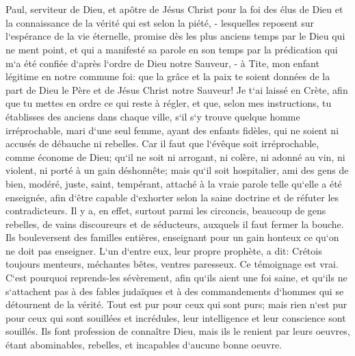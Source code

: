 

\chapter{}

\verse Paul, serviteur de Dieu, et apôtre de Jésus Christ pour la foi des élus de Dieu et la connaissance de la vérité qui est selon la piété, - 
\verse lesquelles reposent sur l`espérance de la vie éternelle, promise dès les plus anciens temps par le Dieu qui ne ment point, 
\verse et qui a manifesté sa parole en son temps par la prédication qui m`a été confiée d`après l`ordre de Dieu notre Sauveur, - 
\verse à Tite, mon enfant légitime en notre commune foi: que la grâce et la paix te soient données de la part de Dieu le Père et de Jésus Christ notre Sauveur! 
\verse Je t`ai laissé en Crète, afin que tu mettes en ordre ce qui reste à régler, et que, selon mes instructions, tu établisses des anciens dans chaque ville, 
\verse s`il s`y trouve quelque homme irréprochable, mari d`une seul femme, ayant des enfants fidèles, qui ne soient ni accusés de débauche ni rebelles. 
\verse Car il faut que l`évêque soit irréprochable, comme économe de Dieu; qu`il ne soit ni arrogant, ni colère, ni adonné au vin, ni violent, ni porté à un gain déshonnête; 
\verse mais qu`il soit hospitalier, ami des gens de bien, modéré, juste, saint, tempérant, 
\verse attaché à la vraie parole telle qu`elle a été enseignée, afin d`être capable d`exhorter selon la saine doctrine et de réfuter les contradicteurs. 
\verse Il y a, en effet, surtout parmi les circoncis, beaucoup de gens rebelles, de vains discoureurs et de séducteurs, 
\verse auxquels il faut fermer la bouche. Ils bouleversent des familles entières, enseignant pour un gain honteux ce qu`on ne doit pas enseigner. 
\verse L`un d`entre eux, leur propre prophète, a dit: Crétois toujours menteurs, méchantes bêtes, ventres paresseux. 
\verse Ce témoignage est vrai. C`est pourquoi reprends-les sévèrement, afin qu`ils aient une foi saine, 
\verse et qu`ils ne s`attachent pas à des fables judaïques et à des commandements d`hommes qui se détournent de la vérité. 
\verse Tout est pur pour ceux qui sont purs; mais rien n`est pur pour ceux qui sont souillées et incrédules, leur intelligence et leur conscience sont souillés. 
\verse Ils font profession de connaître Dieu, mais ils le renient par leurs oeuvres, étant abominables, rebelles, et incapables d`aucune bonne oeuvre. 

\chapter{}

